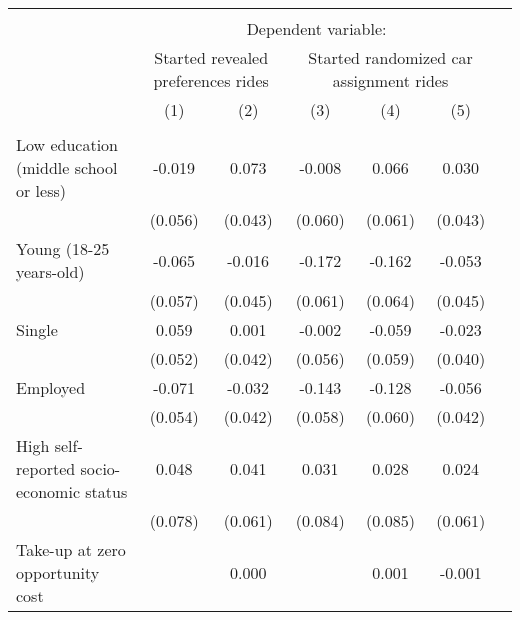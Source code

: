 \begin{tabular}{l*{6}{c}} \hline\hline \\[-1.8ex] & \multicolumn{5}{c}{Dependent variable:} \\[-1.8ex]
                    &\multicolumn{2}{p{3.2cm}}{\center Started revealed preferences rides}&\multicolumn{3}{p{5cm}}{\center Started randomized car assignment rides}\\\cmidrule(lr){2-3}\cmidrule(lr){4-6}
                    &\multicolumn{1}{c}{(1)}         &\multicolumn{1}{c}{(2)}         &\multicolumn{1}{c}{(3)}         &\multicolumn{1}{c}{(4)}         &\multicolumn{1}{c}{(5)}         \\
\hline \\[-1.8ex]
Low education (middle school or less)&      -0.019         &       0.073\sym{*}  &      -0.008         &       0.066         &       0.030         \\
                    &     (0.056)         &     (0.043)         &     (0.060)         &     (0.061)         &     (0.043)         \\
[1em]
Young (18-25 years-old)&      -0.065         &      -0.016         &      -0.172\sym{***}&      -0.162\sym{**} &      -0.053         \\
                    &     (0.057)         &     (0.045)         &     (0.061)         &     (0.064)         &     (0.045)         \\
[1em]
Single              &       0.059         &       0.001         &      -0.002         &      -0.059         &      -0.023         \\
                    &     (0.052)         &     (0.042)         &     (0.056)         &     (0.059)         &     (0.040)         \\
[1em]
Employed            &      -0.071         &      -0.032         &      -0.143\sym{**} &      -0.128\sym{**} &      -0.056         \\
                    &     (0.054)         &     (0.042)         &     (0.058)         &     (0.060)         &     (0.042)         \\
[1em]
High self-reported socio-economic status&       0.048         &       0.041         &       0.031         &       0.028         &       0.024         \\
                    &     (0.078)         &     (0.061)         &     (0.084)         &     (0.085)         &     (0.061)         \\
[1em]
Take-up at zero opportunity cost&                     &       0.000         &                     &       0.001         &      -0.001         \\

\end{tabular}
